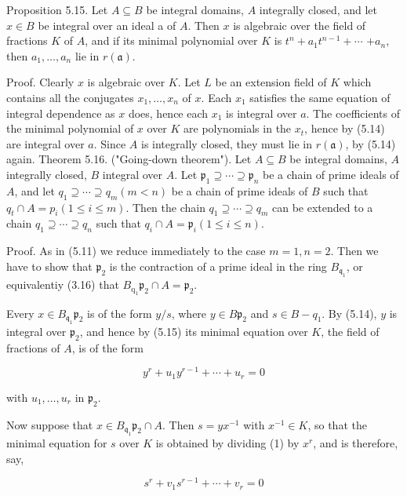 \documentclass{standalone}
\theoremstyle{definition}
\theoremstyle{remark}
\begin{document}
Proposition 5.15. Let $A \subseteq B$ be integral domains, $A$ integrally closed, and let $x \in B$ be integral over an ideal a of $A$. Then $x$ is algebraic over the field of fractions $K$ of $A$, and if its minimal polynomial over $K$ is $t^{n}+a_{1} t^{n-1}+\cdots$ $+a_{n}$, then $a_{1}, \ldots, a_{n}$ lie in $r(\mathfrak{a})$.

Proof. Clearly $x$ is algebraic over $K$. Let $L$ be an extension field of $K$ which contains all the conjugates $x_{1}, \ldots, x_{n}$ of $x$. Each $x_{1}$ satisfies the same equation of integral dependence as $x$ does, hence each $x_{1}$ is integral over $a$. The coefficients of the minimal polynomial of $x$ over $K$ are polynomials in the $x_{t}$, hence by (5.14) are integral over $a$. Since $A$ is integrally closed, they must lie in $r(\mathfrak{a})$, by (5.14) again. Theorem 5.16. ("Going-down theorem"). Let $A \subseteq B$ be integral domains, $A$ integrally closed, $B$ integral over $A$. Let $\mathfrak{p}_{1} \supseteq \cdots \supseteq \mathfrak{p}_{n}$ be a chain of prime ideals of $A$, and let $q_{1} \supseteq \cdots \supseteq q_{m}(m<n)$ be a chain of prime ideals of $B$ such that $q_{t} \cap A=p_{i}(1 \leqslant i \leqslant m)$. Then the chain $q_{1} \supseteq \cdots \supseteq q_{m}$ can be extended to a chain $q_{1} \supseteq \cdots \supseteq q_{n}$ such that $q_{i} \cap A=\mathfrak{p}_{i}(1 \leqslant i \leqslant n)$.

Proof. As in (5.11) we reduce immediately to the case $m=1, n=2$. Then we have to show that $\mathfrak{p}_{2}$ is the contraction of a prime ideal in the ring $B_{\mathfrak{q}_{1}}$, or equivalentiy (3.16) that $B_{\mathrm{q}_{1}} \mathfrak{p}_{2} \cap A=\mathfrak{p}_{2}$.

Every $x \in B_{\mathfrak{q}_{1}} \mathfrak{p}_{2}$ is of the form $y / s$, where $y \in B \mathfrak{p}_{2}$ and $s \in B-q_{1}$. By (5.14), $y$ is integral over $\mathfrak{p}_{2}$, and hence by (5.15) its minimal equation over $K$, the field of fractions of $A$, is of the form

\[
y^{r}+u_{1} y^{r-1}+\cdots+u_{r}=0
\]

with $u_{1}, \ldots, u_{r}$ in $\mathfrak{p}_{2}$.

Now suppose that $x \in B_{\mathfrak{q}_{1}} \mathfrak{p}_{2} \cap A$. Then $s=y x^{-1}$ with $x^{-1} \in K$, so that the minimal equation for $s$ over $K$ is obtained by dividing (1) by $x^{r}$, and is therefore, say,

\[
s^{r}+v_{1} s^{r-1}+\cdots+v_{r}=0
\]
\end{document}
